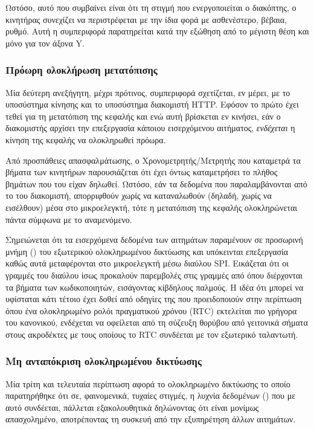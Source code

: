 Ωστόσο, αυτό που συμβαίνει είναι ότι τη στιγμή που ενεργοποιείται ο διακόπτης,
ο κινητήρας συνεχίζει να περιστρέφεται με την ίδια φορά με ασθενέστερο, βέβαια,
ρυθμό. Αυτή η συμπεριφορά παρατηρείται κατά την εξώθηση από το μέγιστη θέση και
μόνο για τον άξονα Y.


\subsubsection{Πρόωρη ολοκλήρωση μετατόπισης}

Μία δεύτερη ανεξήγητη, μέχρι πρότινος, συμπεριφορά σχετίζεται, εν μέρει, με το
υποσύστημα κίνησης και το υποσύστημα διακομιστή HTTP. Εφόσον το πρώτο έχει
τεθεί για τη μετατόπιση της κεφαλής και ενώ αυτή βρίσκεται εν κινήσει, εάν ο
διακομιστής αρχίσει την επεξεργασία κάποιου εισερχόμενου αιτήματος,
\emph{ενδέχεται} η κίνηση της κεφαλής να ολοκληρωθεί πρόωρα.

Από προσπάθειες απασφαλμάτωσης, ο Χρονομετρητής\slash{}Μετρητής που καταμετρά
τα βήματα των κινητήρων παρουσιάζεται ότι έχει όντως καταμετρήσει το πλήθος
βημάτων που του είχαν δηλωθεί. Ωστόσο, εάν τα δεδομένα που παραλαμβάνονται από
το  του διακομιστή, απορριφθούν χωρίς να καταναλωθούν (δηλαδή, χωρίς
να εισέλθουν) μέσα στο μικροελεγκτή, τότε η μετατόπιση της κεφαλής ολοκληρώνεται
πάντα σύμφωνα με το αναμενόμενο.

Σημειώνεται ότι τα εισερχόμενα δεδομένα των αιτημάτων παραμένουν σε προσωρινή
μνήμη () του εξωτερικού ολοκληρωμένου δικτύωσης και υπόκεινται
επεξεργασία καθώς αυτά μεταφέρονται στο μικροελεγκτή μέσω διαύλου SPI. Εικάζεται
ότι οι γραμμές του διαύλου ίσως προκαλούν παρεμβολές στις γραμμές από όπου
διέρχονται τα βήματα των κωδικοποιητών, εισάγοντας κίβδηλους παλμούς. Η ιδέα ότι
μπορεί να υφίσταται κάτι τέτοιο έχει δοθεί από οδηγίες της
\textcite[7]{maxim:xtal} που προειδοποιούν στην περίπτωση όπου ένα
ολοκληρωμένο ρολόι πραγματικού χρόνου (RTC) εκτελείται πιο γρήγορα του
κανονικού, ενδέχεται να οφείλεται από τη σύζευξη θορύβου από γειτονικά σήματα
στους ακροδέκτες με τους οποίους το RTC συνδέεται με τον εξωτερικό ταλαντωτή.


\subsubsection{Μη ανταπόκριση ολοκληρωμένου δικτύωσης}

Μία τρίτη και τελευταία περίπτωση αφορά το ολοκληρωμένο δικτύωσης το οποίο
παρατηρήθηκε ότι σε, φαινομενικά, τυχαίες στιγμές, η λυχνία δεδομένων
() που με αυτό συνδέεται, πάλλεται εξακολουθητικά δηλώνοντας ότι
είναι μονίμως απασχολημένο, αποτρέποντας τη συσκευή από την εξυπηρέτηση άλλων
αιτημάτων.


